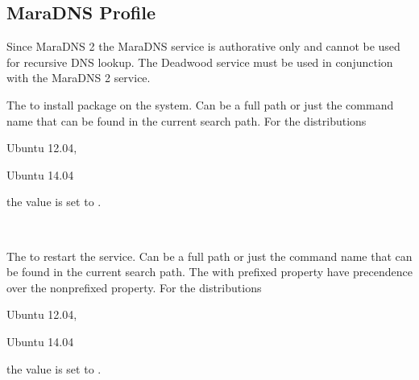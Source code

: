 \label{sec:maradns_profile}
\subsection{MaraDNS Profile}

Since MaraDNS 2 the MaraDNS service is authorative only and cannot be used
for recursive DNS lookup. The Deadwood service must be used in conjunction
with the MaraDNS 2 service.


The  to install package on the system. Can be a full path or
just the command name that can be found in the current search path. 
For the distributions
\begin{inparaitem}
\item[\TheDistribution{ubuntu}] Ubuntu 12.04,
\item[\TheDistribution{ubuntu}] Ubuntu 14.04
\end{inparaitem}
the value is set to .

\\

The  to restart the service. Can be a full path or
just the command name that can be found in the current search path. 
The with  prefixed property have precendence over the 
nonprefixed property.
For the distributions
\begin{inparaitem}
\item[\TheDistribution{ubuntu}] Ubuntu 12.04,
\item[\TheDistribution{ubuntu}] Ubuntu 14.04
\end{inparaitem}
the value is set to .

\\

